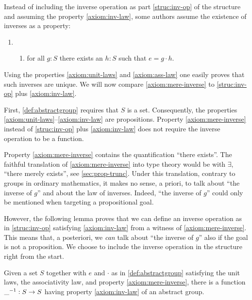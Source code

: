 \begin{remark}\label{rem:inverses-as-property}
  \makeatletter %
  \renewcommand\p@enumii{}%
  \makeatother%
  Instead of including the inverse operation as part
  \ref{struc:inv-op} of the structure and assuming the property
  \ref{axiom:inv-law}, some authors assume the existence of inverses
  as a property:
  \begin{enumerate}
  \item[]\begin{enumerate}[resume*,label=(\alph*),ref=(\alph*)]
    \item\label{axiom:mere-inverse} for all $g:S$ there exists an
      $h:S$ such that $e = g \cdot h$.
    \end{enumerate}
  \end{enumerate}
  Using the properties \ref{axiom:unit-laws} and
  \ref{axiom:ass-law} one easily proves that such inverses are
  unique. We will now compare \ref{axiom:mere-inverse} to \ref{struc:inv-op} plus
  \ref{axiom:inv-law}.

  First, \cref{def:abstractgroup} requires that $S$ is a set.
  Consequently, the properties
  \ref{axiom:unit-laws}--\ref{axiom:inv-law} are propositions.
  Property \ref{axiom:mere-inverse} instead of \ref{struc:inv-op} plus
  \ref{axiom:inv-law} does not require the inverse operation to be a
  function.

  Property \ref{axiom:mere-inverse} contains the quantification
  ``there exists''.  The faithful translation of
  \ref{axiom:mere-inverse} into type theory would be with $\exists$,
  ``there merely exists'', see \cref{sec:prop-trunc}.  Under this
  translation, contrary to groups in ordinary mathematics, it makes no
  sense, a priori, to talk about ``the inverse of $g$'' and about the
  law of inverses.  Indeed, ``the inverse of $g$'' could only be
  mentioned when targeting a propositional goal.

  However, the following lemma proves that we can define an inverse
  operation as in \ref{struc:inv-op} satisfying
  \ref{axiom:inv-law} from a witness of \ref{axiom:mere-inverse}.
  This means that, a posteriori, we \emph{can} talk about ``the
  inverse of $g$'' also if the goal is not a proposition.  We choose
  to include the inverse operation in the structure right from the
  start.
\end{remark}

\begin{lemma}%
  \label{lem:group-inv-operation}%
  Given a set $S$ together with $e$ and $\cdot$ as in
  \cref{def:abstractgroup} satisfying the unit laws, the associativity
  law, and property \ref{axiom:mere-inverse}, there is a function
  $\_^{-1}: S \to S$ having property \ref{axiom:inv-law} of an
  abstract group.
\end{lemma}

